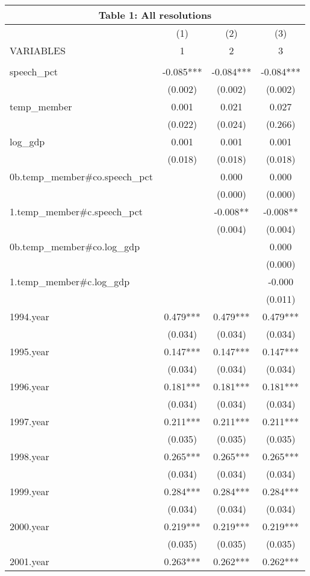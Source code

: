 \documentclass[]{article}
\begin{document}
\begin{tabular}{lccc}
\multicolumn{4}{c}{Table 1: All resolutions} \\ \hline
 & (1) & (2) & (3) \\
VARIABLES & 1 & 2 & 3 \\ \hline
 &  &  &  \\
speech\_pct & -0.085*** & -0.084*** & -0.084*** \\
 & (0.002) & (0.002) & (0.002) \\
temp\_member & 0.001 & 0.021 & 0.027 \\
 & (0.022) & (0.024) & (0.266) \\
log\_gdp & 0.001 & 0.001 & 0.001 \\
 & (0.018) & (0.018) & (0.018) \\
0b.temp\_member\#co.speech\_pct &  & 0.000 & 0.000 \\
 &  & (0.000) & (0.000) \\
1.temp\_member\#c.speech\_pct &  & -0.008** & -0.008** \\
 &  & (0.004) & (0.004) \\
0b.temp\_member\#co.log\_gdp &  &  & 0.000 \\
 &  &  & (0.000) \\
1.temp\_member\#c.log\_gdp &  &  & -0.000 \\
 &  &  & (0.011) \\
1994.year & 0.479*** & 0.479*** & 0.479*** \\
 & (0.034) & (0.034) & (0.034) \\
1995.year & 0.147*** & 0.147*** & 0.147*** \\
 & (0.034) & (0.034) & (0.034) \\
1996.year & 0.181*** & 0.181*** & 0.181*** \\
 & (0.034) & (0.034) & (0.034) \\
1997.year & 0.211*** & 0.211*** & 0.211*** \\
 & (0.035) & (0.035) & (0.035) \\
1998.year & 0.265*** & 0.265*** & 0.265*** \\
 & (0.034) & (0.034) & (0.034) \\
1999.year & 0.284*** & 0.284*** & 0.284*** \\
 & (0.034) & (0.034) & (0.034) \\
2000.year & 0.219*** & 0.219*** & 0.219*** \\
 & (0.035) & (0.035) & (0.035) \\
2001.year & 0.263*** & 0.262*** & 0.262*** \\

\end{tabular}
\end{document}
